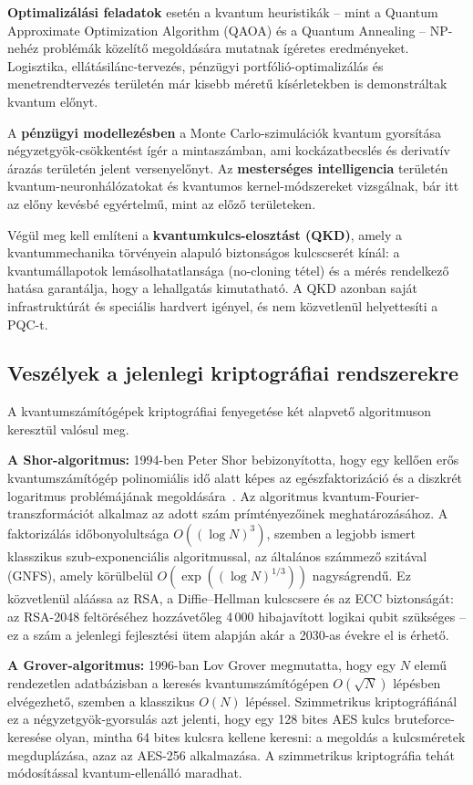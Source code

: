 \textbf{Optimalizálási feladatok} esetén a kvantum heuristikák -- mint a Quantum Approximate
Optimization Algorithm (QAOA) és a Quantum Annealing -- NP-nehéz problémák közelítő megoldására
mutatnak ígéretes eredményeket. Logisztika, ellátásilánc-tervezés, pénzügyi portfólió-optimalizálás
és menetrendtervezés területén már kisebb méretű kísérletekben is demonstráltak kvantum
előnyt.

A \textbf{pénzügyi modellezésben} a Monte Carlo-szimulációk kvantum gyorsítása négyzetgyök-csökkentést
ígér a mintaszámban, ami kockázatbecslés és derivatív árazás területén jelent versenyelőnyt.
Az \textbf{mesterséges intelligencia} területén kvantum-neuronhálózatokat és kvantumos kernel-módszereket
vizsgálnak, bár itt az előny kevésbé egyértelmű, mint az előző területeken.

Végül meg kell említeni a \textbf{kvantumkulcs-elosztást (QKD)}, amely a kvantummechanika
törvényein alapuló biztonságos kulcscserét kínál: a kvantumállapotok lemásolhatatlansága
(no-cloning tétel) és a mérés rendelkező hatása garantálja, hogy a lehallgatás kimutatható.
A QKD azonban saját infrastruktúrát és speciális hardvert igényel, és nem közvetlenül helyettesíti
a PQC-t.

\subsection{Veszélyek a jelenlegi kriptográfiai rendszerekre}

A kvantumszámítógépek kriptográfiai fenyegetése két alapvető algoritmuson keresztül valósul meg.

\textbf{A Shor-algoritmus:} 1994-ben Peter Shor bebizonyította, hogy egy kellően erős kvantumszámítógép polinomiális
idő alatt képes az egészfaktorizáció és a diszkrét logaritmus problémájának megoldásá\-ra~\cite{shor1994}.
Az algoritmus kvantum-Fourier-transzformációt alkalmaz az adott szám prímtényezőinek
meghatározásához. A faktorizálás időbonyolultsága $O((\log N)^3)$, szemben a legjobb ismert
klasszikus szub-exponenciális algoritmussal, az általános számmező szitával (GNFS), amely körülbelül
$O(\exp((\log N)^{1/3}))$ nagyságrendű. Ez közvetlenül aláássa az RSA, a Diffie--Hellman
kulcscsere és az ECC biztonságát: az RSA-2048 feltöréséhez hozzávetőleg 4\,000 hibajavított
logikai qubit szükséges -- ez a szám a jelenlegi fejlesztési ütem alapján akár a 2030-as évekre
el is érhető.

\textbf{A Grover-algoritmus:} 1996-ban Lov Grover megmutatta, hogy egy $N$ elemű rendezetlen
adatbázisban a keresés kvantumszámítógépen $O(\sqrt{N})$ lépésben elvégezhető,
szemben a klasszikus $O(N)$ lépéssel. Szimmetrikus kriptográfiánál ez a négyzetgyök-gyorsulás azt
jelenti, hogy egy 128 bites AES kulcs bruteforce-keresése olyan, mintha 64 bites kulcsra kellene
keresni: a megoldás a kulcsméretek megduplázása, azaz az AES-256 alkalmazása. A szimmetrikus
kriptográfia tehát módosítással kvantum-ellenálló maradhat.

